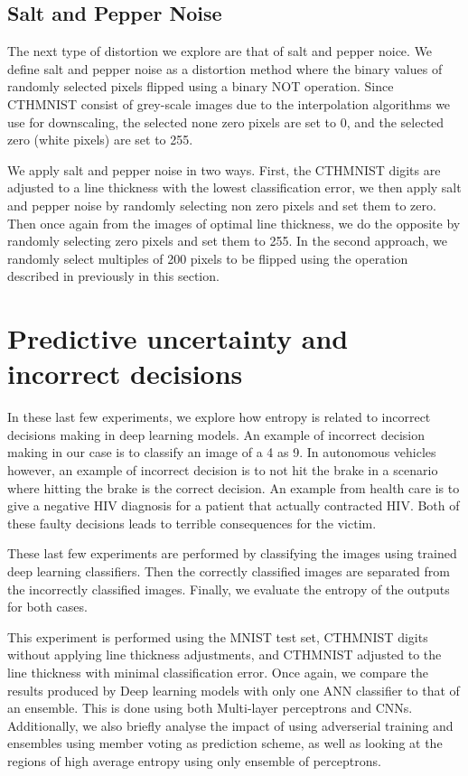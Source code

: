 \subsection{Salt and Pepper Noise}

The next type of distortion we explore are that of salt and pepper noice. We define salt and pepper noise as a distortion method where the binary values of randomly selected pixels flipped using a binary NOT operation. Since CTHMNIST consist of grey-scale images due to the interpolation algorithms we use for downscaling, the selected none zero pixels are set to 0, and the selected zero (white pixels) are set to 255.

We apply salt and pepper noise in two ways. First, the CTHMNIST digits are adjusted to a line thickness with the lowest classification error, we then apply salt and pepper noise by randomly selecting non zero pixels and set them to zero. Then once again from the images of optimal line thickness, we do the opposite by randomly selecting zero pixels and set them to 255. In the second approach, we randomly select multiples of 200 pixels to be flipped using the operation described in previously in this section.

\section{Predictive uncertainty and incorrect decisions}

In these last few experiments, we explore how entropy is related to incorrect decisions making in deep learning models. An example of incorrect decision making in our case is to classify an image of a 4 as 9. In autonomous vehicles however, an example of incorrect decision is to not hit the brake in a scenario where hitting the brake is the correct decision. An example from health care is to give a negative HIV diagnosis for a patient that actually contracted HIV. 
Both of these faulty decisions leads to terrible consequences for the victim.

These last few experiments are performed by classifying the images using trained deep learning classifiers. Then the correctly classified images are separated from the incorrectly classified images. Finally, we evaluate the entropy of the outputs for both cases.

This experiment is performed using the MNIST test set,  CTHMNIST digits without applying line thickness adjustments, and CTHMNIST adjusted to the line thickness with minimal classification error. Once again, we compare the results produced by Deep learning models with only one ANN classifier to that of an ensemble. This is done using both Multi-layer perceptrons and CNNs. Additionally, we also briefly analyse the impact of using adverserial training and ensembles using member voting as prediction scheme, as well as looking at the regions of high average entropy using only ensemble of perceptrons.

